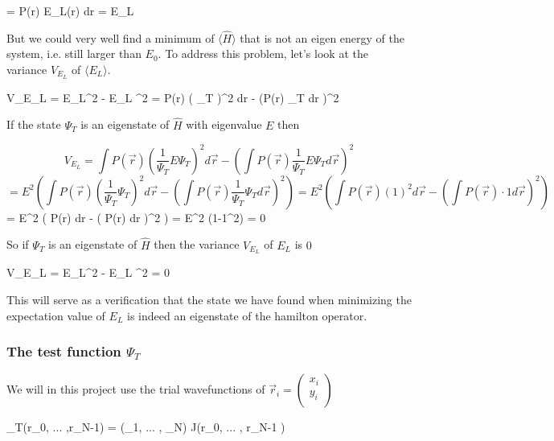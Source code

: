 \eqs
\langle {} \rangle = \int P(\vec r) E_L(\vec r) d\vec r = \langle E_L \rangle
\eqf

But we could very well find a minimum of $\langle \hat{H} \rangle$ that is not an eigen energy of the system, i.e. still larger than $E_0$.
To address this problem, let's look at the variance $V_{E_L}$ of $\langle E_L \rangle$. 

\eqs
V_{E_L} = \langle E_L^2 \rangle - \langle E_L \rangle^2
= 
\int P(\vec r) \left (  \Psi_T \right )^2 d\vec r -
\left (\int P(\vec r)   \Psi_T d\vec r \right )^2
\eqf 

If the state $\Psi_T$ is an eigenstate of $\hat{H}$ with eigenvalue $E$ then 

\[
V_{E_L} = \int P(\vec r) \left (\frac{1}{\Psi_T} E \Psi_T \right )^2 d\vec r -
\left (\int P(\vec r) \frac{1}{\Psi_T} E \Psi_T d\vec r \right )^2
\]
\[
=E^2
\left ( 
\int P(\vec r) \left (\frac{1}{\Psi_T} \Psi_T \right )^2 d\vec r -
\left (\int P(\vec r) \frac{1}{\Psi_T} \Psi_T d\vec r \right )^2
\right ) = 
E^2 
\left ( 
\int P(\vec r) (1)^2 d\vec r -
\left ( \int P(\vec r) \cdot 1 d\vec r \right )^2
\right )
\]
\eqs
=
E^2 
\left ( 
\int P(\vec r) d\vec r -
\left ( \int P(\vec r) d\vec r \right )^2
\right ) = E^2 (1-1^2) = 0
\eqf

So if $\Psi_T$ is an eigenstate of $\hat{H}$ then the variance $V_{E_L}$ of $E_L$ is $0$

\eqs
V_{E_L} = \langle E_L^2 \rangle - \langle E_L \rangle^2 = 0
\eqf 

This will serve as a verification that the state we have found when minimizing the expectation value of $E_L$ is indeed an eigenstate of the hamilton operator. 










\subsubsection{The test function $\Psi_T$}

We will in this project use the trial wavefunctions of $\vec r_i = \left ( \begin{matrix} x_i \\ y_i \\ \end{matrix}\right )$

\eqs
\Psi_T(\vec r_0, ... ,\vec r_{N-1})  = \Det(\phi_1,  ... , \phi_N) \cdot \textrm{J}(\vec r_0, ... , \vec r_{N-1} )
\eqf

